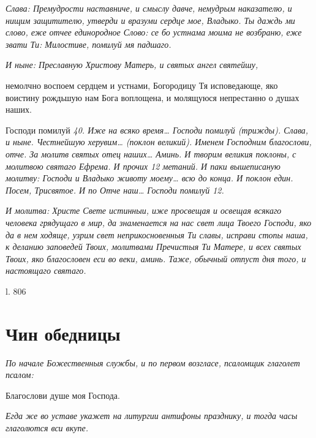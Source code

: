  \itshape Слава:\normalfont{} Премудрости наставниче, и смыслу давче, немудрым наказателю,
и нищим защитителю, утверди и вразуми сердце мое, Владыко. Ты даждь ми
слово, еже отчее единородное Слово: се бо устнама моима не возбраню, еже
звати Ти: Милостиве, помилуй мя падшаго.


 \itshape И ныне:\normalfont{} Преславную Христову Матерь, и святых ангел святейшу,

немолчно воспоем сердцем и устнами, Богородицу Тя исповедающе, яко
воистину рождьшую нам Бога воплощена, и молящуюся непрестанно о
душах наших.


   Господи помилуй \itshape 40\normalfont{}. Иже на всяко время… Господи помилуй \itshape (трижды)\normalfont{}.
\itshape Слава, и ныне\normalfont{}. Честнейшую херувим… \itshape (поклон великий)\normalfont{}. Именем Господним
благослови, отче. За молитв святых отец наших… Аминь. \itshape И творим великия
поклоны, с молитвою святаго Ефрема. И прочих 12 метаний. И паки
вышеписаную молитву:\normalfont{} Господи и Владыко животу моему… \itshape всю до конца. И
поклон един. Посем,\normalfont{} \itshape Трисвятое\normalfont{}. \itshape И по\normalfont{} Отче наш… Господи помилуй
\itshape 12\normalfont{}.


 \itshape И молитва:\normalfont{} Христе Свете истинныи, иже просвещая и освещая всякаго
человека грядущаго в мир, да знаменается на нас свет лица Твоего Господи,
яко да в нем ходяще, узрим свет неприкосновенныя Ти славы, исправи стопы
наша, к деланию заповедей Твоих, молитвами Пречистыя Ти Матере, и всех
святых Твоих, яко благословен еси во веки, аминь. \itshape Таже, обычный отпуст
дня того, и настоящаго святаго\normalfont{}.

   l. 806


 

\section{Чин обедницы}



\itshape По начале Божественныя службы, и по первом возгласе, псаломщик глаголет
псалом:\normalfont{}


   Благослови душе моя Господа.


 \itshape Егда же во уставе укажет на литургии антифоны празднику, и тогда
часы глаголются вси вкупе.\normalfont{}






